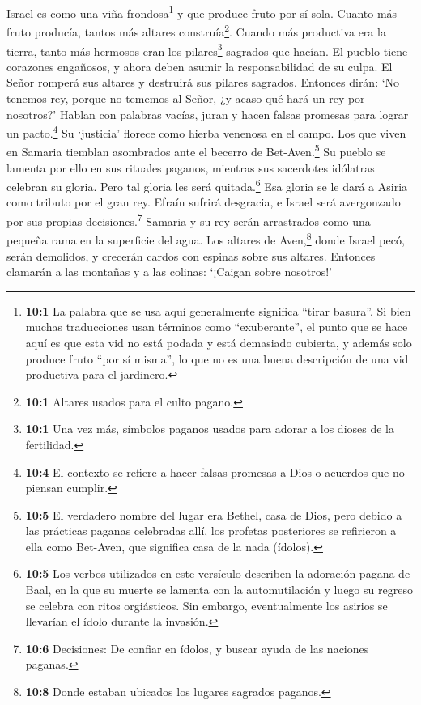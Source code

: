  Israel es como una viña frondosa\footnote{\textbf{10:1} La
  palabra que se usa aquí generalmente significa ``tirar basura''. Si
  bien muchas traducciones usan términos como ``exuberante'', el punto
  que se hace aquí es que esta vid no está podada y está demasiado
  cubierta, y además solo produce fruto ``por sí misma'', lo que no es
  una buena descripción de una vid productiva para el jardinero.} y que
produce fruto por sí sola. Cuanto más fruto producía, tantos más altares
construía\footnote{\textbf{10:1} Altares usados para el culto pagano.}.
Cuando más productiva era la tierra, tanto más hermosos eran los
pilares\footnote{\textbf{10:1} Una vez más, símbolos paganos usados para
  adorar a los dioses de la fertilidad.} sagrados que hacían.
 El pueblo tiene corazones engañosos, y ahora deben asumir
la responsabilidad de su culpa. El Señor romperá sus altares y destruirá
sus pilares sagrados.  Entonces dirán: `No tenemos rey,
porque no tememos al Señor, ¿y acaso qué hará un rey por nosotros?'
 Hablan con palabras vacías, juran y hacen falsas promesas
para lograr un pacto.\footnote{\textbf{10:4} El contexto se refiere a
  hacer falsas promesas a Dios o acuerdos que no piensan cumplir.} Su
`justicia' florece como hierba venenosa en el campo.  Los
que viven en Samaria tiemblan asombrados ante el becerro de
Bet-Aven.\footnote{\textbf{10:5} El verdadero nombre del lugar era
  Bethel, casa de Dios, pero debido a las prácticas paganas celebradas
  allí, los profetas posteriores se refirieron a ella como Bet-Aven, que
  significa casa de la nada (ídolos).} Su pueblo se lamenta por ello en
sus rituales paganos, mientras sus sacerdotes idólatras celebran su
gloria. Pero tal gloria les será quitada.\footnote{\textbf{10:5} Los
  verbos utilizados en este versículo describen la adoración pagana de
  Baal, en la que su muerte se lamenta con la automutilación y luego su
  regreso se celebra con ritos orgiásticos. Sin embargo, eventualmente
  los asirios se llevarían el ídolo durante la invasión.} Esa gloria se
le dará a Asiria como tributo por el gran rey.  Efraín
sufrirá desgracia, e Israel será avergonzado por sus propias
decisiones.\footnote{\textbf{10:6} Decisiones: De confiar en ídolos, y
  buscar ayuda de las naciones paganas.}  Samaria y su rey
serán arrastrados como una pequeña rama en la superficie del agua.
 Los altares de Aven,\footnote{\textbf{10:8} Donde estaban
  ubicados los lugares sagrados paganos.} donde Israel pecó, serán
demolidos, y crecerán cardos con espinas sobre sus altares. Entonces
clamarán a las montañas y a las colinas: `¡Caigan sobre nosotros!'

